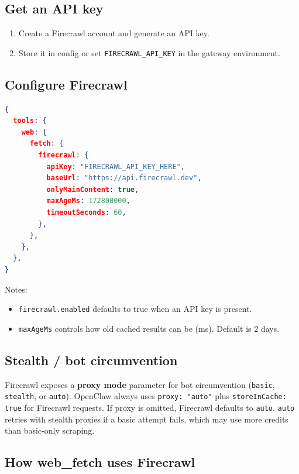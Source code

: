 \subsection{Get an API key}


\begin{enumerate}
  \item Create a Firecrawl account and generate an API key.
  \item Store it in config or set \texttt{FIRECRAWL\_API\_KEY} in the gateway environment.
\end{enumerate}


\subsection{Configure Firecrawl}


\begin{lstlisting}[language=json]
{
  tools: {
    web: {
      fetch: {
        firecrawl: {
          apiKey: "FIRECRAWL_API_KEY_HERE",
          baseUrl: "https://api.firecrawl.dev",
          onlyMainContent: true,
          maxAgeMs: 172800000,
          timeoutSeconds: 60,
        },
      },
    },
  },
}
\end{lstlisting}


Notes:

\begin{itemize}
  \item \texttt{firecrawl.enabled} defaults to true when an API key is present.
  \item \texttt{maxAgeMs} controls how old cached results can be (ms). Default is 2 days.
\end{itemize}


\subsection{Stealth / bot circumvention}


Firecrawl exposes a \textbf{proxy mode} parameter for bot circumvention (\texttt{basic}, \texttt{stealth}, or \texttt{auto}).
OpenClaw always uses \texttt{proxy: "auto"} plus \texttt{storeInCache: true} for Firecrawl requests.
If proxy is omitted, Firecrawl defaults to \texttt{auto}. \texttt{auto} retries with stealth proxies if a basic attempt fails, which may use more credits
than basic-only scraping.

\subsection{How web\_fetch uses Firecrawl}



